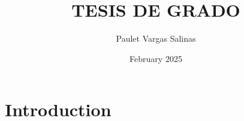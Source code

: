 \documentclass{article}
\title{TESIS DE GRADO}
\author{Paulet Vargas Salinas}
\date{February 2025}
\begin{document}
\maketitle

\section{Introduction}
\end{document}
